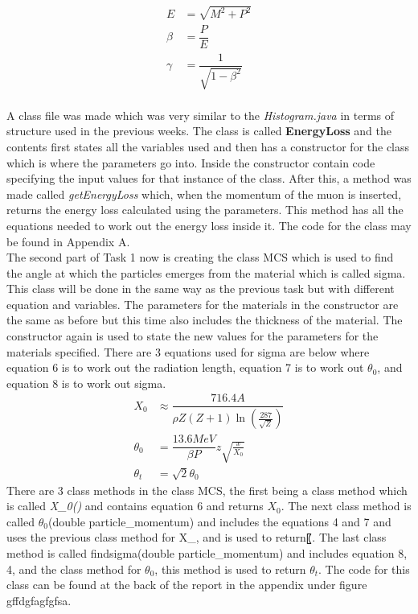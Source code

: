 \documentclass{article}
\begin{document}
	\begin{align}
	E &= \sqrt{M^2 + P^2} \\
	\beta &= \dfrac{P}{E} \\
	\gamma &= \dfrac{1}{\sqrt{1-\beta^2}}
	\end{align}
\\ \indent A class file was made which was very similar to the \textit{Histogram.java} in terms of structure used in the previous weeks. The class is called \textbf{EnergyLoss} and the contents first states all the variables used and then has a constructor for the class which is where the parameters go into. Inside the constructor contain code specifying the input values for that instance of the class. After this, a method was made called \textit{getEnergyLoss} which, when the momentum of the muon is inserted, returns the energy loss calculated using the parameters. This method has all the equations needed to work out the energy loss inside it. The code for the class may be found in Appendix A. %
\\ \indent The second part of Task 1 now is creating the class MCS which is used to find the angle at which the particles emerges from the material which is called sigma. This class will be done in the same way as the previous task but with different equation and variables. The parameters for the materials in the constructor are the same as before but this time also includes the thickness of the material. The constructor again is used to state the new values for the parameters for the materials specified. There are 3 equations used for sigma are below where equation 6 is to work out the radiation length, equation 7 is to work out $\theta_0$, and equation 8 is to work out sigma. %
	\begin{align}
	X_0 &\approx \dfrac{716.4A}{\rho Z(Z+1)  \ln{(\frac{287}{\sqrt{Z}})}} \\ 
	\theta_0 &= \dfrac{13.6 MeV}{\beta P}z\sqrt{\frac{x}{X_0}} \\
	\theta_t &= \sqrt{2}\theta_0
	\end{align}
There are 3 class methods in the class MCS, the first being a class method which is called \textit{X\_0()} and contains equation 6 and returns $X_0$. The next class method is called $\theta_0$(double particle\_momentum) and includes the equations 4 and 7 and uses the previous class method for X\_, and is used to return〖. The last class method is called findsigma(double particle\_momentum) and includes equation 8, 4, and the class method for $\theta_0$, this method is used to return $\theta_t$. The code for this class can be found at the back of the report in the appendix under figure gffdgfagfgfsa. %
\end{document}
